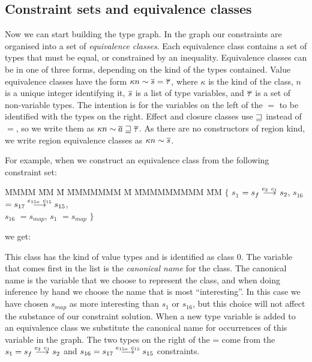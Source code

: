 \subsection{Constraint sets and equivalence classes}
\label{Inference:Constraints:sets-and-equiv-classes}

Now we can start building the type graph. In the graph our constraints are organised into a set of \emph{equivalence classes}. Each equivalence class contains a set of types that must be equal, or constrained by an inequality. Equivalence classes can be in one of three forms, depending on the kind of the types contained. Value equivalence classes have the form $\kappa n \sim \overline{s} = \overline{\tau}$, where $\kappa$ is the kind of the class, $n$ is a unique integer identifying it, $\overline{s}$ is a list of type variables, and $\overline{\tau}$ is a set of non-variable types. The intention is for the variables on the left of the $=$ to be identified with the types on the right. Effect and closure classes use $\sqsupseteq$ instead of $=$, so we write them as $\kappa n \sim \overline{a} \sqsupseteq \overline{\tau}$. As there are no constructors of region kind, we write region equivalence classes as $\kappa n \sim \overline{s}$. 

For example, when we construct an equivalence class from the following constraint set:
\begin{tabbing}
	MMMM	\= MM	\= M \= MMMMMMM \= M \= MMMMMMMMM \= MM \kill
	\>	$\{$	\> $s_1$	\> $= s_f \stackrel{e_2 \ c_1}{\longrightarrow} s_2$, 
			\> $s_{16}$	\> $= s_{17} \stackrel{e_{15a} \ c_{15}}{\longrightarrow} s_{15}$,
	\\
	\>		\> $s_{16}$	\> $= s_{map}$,
			\> $s_{1}$	\> $= s_{map}$
			\> $\}$
\end{tabbing}
we get:



This class has the kind of value types and is identified as class 0. The variable that comes first in the list is the \emph{canonical name} for the class.  The canonical name is the variable that we choose to represent the class, and when doing inference by hand we choose the name that is most ``interesting''. In this case we have chosen $s_{map}$ as more interesting than $s_1$ or $s_{16}$, but this choice will not affect the substance of our constraint solution. When a new type variable is added to an equivalence class we substitute the canonical name for occurrences of this variable in the graph. The two types on the right of the = come from the $s_1 = s_f \stackrel{e_2 \ c_1}{\longrightarrow} s_2$ and $s_{16} = s_{17} \stackrel{e_{15a} \ c_{15}}{\longrightarrow} s_{15}$ constraints.

